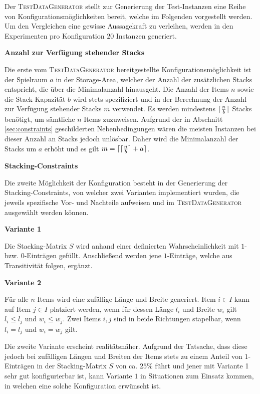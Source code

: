 Der \textsc{TestDataGenerator} stellt zur Generierung der Test-Instanzen eine Reihe von Konfigurationsmöglichkeiten
bereit, welche im Folgenden vorgestellt werden. Um den Vergleichen eine gewisse Aussagekraft zu verleihen,
werden in den Experimenten pro Konfiguration $20$ Instanzen generiert.

\textbf{Anzahl zur Verfügung stehender Stacks}

Die erste vom \textsc{TestDataGenerator} bereitgestellte Konfigurationsmöglichkeit ist der Spielraum $a$ in der Storage-Area, welcher der Anzahl der zusätzlichen Stacks entspricht, die über die Minimalanzahl hinausgeht.
Die Anzahl der Items $n$ sowie die Stack-Kapazität $b$ wird stets spezifiziert und in der Berechnung der Anzahl zur Verfügung stehender Stacks $m$ verwendet. Es werden mindestens $\lceil\frac{n}{b}\rceil$ Stacks benötigt, um sämtliche $n$ Items zuzuweisen.
Aufgrund der in Abschnitt \ref{sec:constraints} geschilderten Nebenbedingungen wären die meisten Instanzen bei dieser
Anzahl an Stacks jedoch unlösbar. Daher wird die Minimalanzahl der Stacks um $a$ erhöht und es gilt
$m = \lceil\lceil\frac{n}{b}\rceil + a\rceil$.

\textbf{Stacking-Constraints}

Die zweite Möglichkeit der Konfiguration besteht in der Generierung der Stacking-Constraints,
von welcher zwei Varianten implementiert wurden, die jeweils spezifische Vor- und Nachteile aufweisen
und im \textsc{TestDataGenerator} ausgewählt werden können.

\textbf{Variante 1}

Die Stacking-Matrix $S$ wird anhand einer definierten Wahrscheinlichkeit mit $1$- bzw. $0$-Einträgen gefüllt. Anschließend werden jene $1$-Einträge, welche aus Transitivität folgen, ergänzt.

\textbf{Variante 2}

Für alle $n$ Items wird eine zufällige Länge und Breite generiert. Item $i \in I$ kann auf Item $j \in I$
platziert werden, wenn für dessen Länge $l_i$ und Breite $w_i$ gilt $l_i \leq l_j$ und $w_i \leq w_j$.
Zwei Items $i, j$ sind in beide Richtungen stapelbar, wenn $l_i = l_j$ und $w_i = w_j$ gilt.

Die zweite Variante erscheint realitätsnäher. Aufgrund der Tatsache, dass diese jedoch bei zufälligen Längen und
Breiten der Items stets zu einem Anteil von $1$-Einträgen in der Stacking-Matrix $S$ von ca. $25\%$ führt
und jener mit Variante 1 sehr gut konfigurierbar ist, kann Variante $1$ in Situationen zum Einsatz kommen,
in welchen eine solche Konfiguration erwünscht ist.

